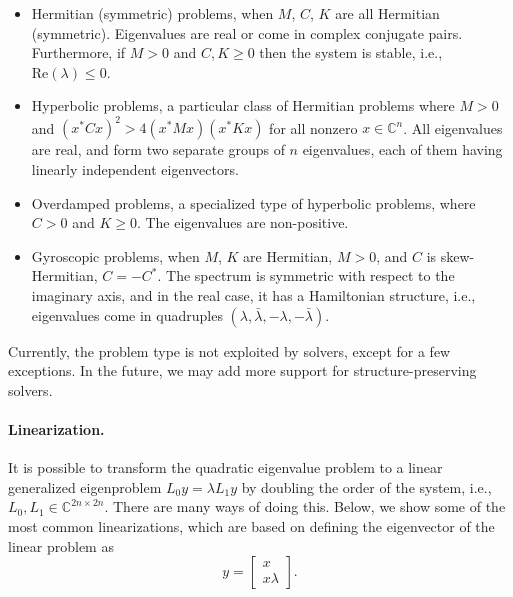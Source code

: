 \begin{itemize}
\item Hermitian (symmetric) problems, when $M$, $C$, $K$ are all Hermitian (symmetric). Eigenvalues are real or come in complex conjugate pairs. Furthermore, if $M>0$ and $C,K\geq 0$ then the system is stable, i.e., $\text{Re}(\lambda)\leq 0$.
\item Hyperbolic problems, a particular class of Hermitian problems where $M>0$ and $(x^*Cx)^2>4(x^*Mx)(x^*Kx)$ for all nonzero $x\in\mathbb{C}^n$. All eigenvalues are real, and form two separate groups of $n$ eigenvalues, each of them having linearly independent eigenvectors.
\item Overdamped problems, a specialized type of hyperbolic problems, where $C>0$ and $K\geq 0$. The eigenvalues are non-positive.
\item Gyroscopic problems, when $M$, $K$ are Hermitian, $M>0$, and $C$ is skew-Hermitian, $C=-C^*$. The spectrum is symmetric with respect to the imaginary axis, and in the real case, it has a Hamiltonian structure, i.e., eigenvalues come in quadruples $(\lambda,\bar{\lambda},-\lambda,-\bar{\lambda})$.
\end{itemize}

Currently, the problem type is not exploited by  solvers, except for a few exceptions. In the future, we may add more support for structure-preserving solvers.

\paragraph{Linearization.}

It is possible to transform the quadratic eigenvalue problem to a linear generalized eigenproblem $L_0y=\lambda L_1y$ by doubling the order of the system, i.e., $L_0,L_1\in\mathbb{C}^{2n\times 2n}$. There are many ways of doing this.
Below, we show some of the most common linearizations,
which are based on defining the eigenvector of the linear problem as
\begin{equation}
\label{eq:linevec}
y=\left[\begin{array}{c}x\\x\lambda\end{array}\right].
\end{equation}

